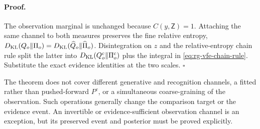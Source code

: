 \paragraph{Proof.}
The observation marginal is unchanged because $C(y,\mathsf Z)=1$.  Attaching
the same channel to both measures preserves the fine relative entropy,
$D_{\mathrm{KL}}(Q_o\Vert\Pi_o)=D_{\mathrm{KL}}(\widehat Q_o\Vert\widehat\Pi_o)$.  Disintegration on
$z$ and the relative-entropy chain rule split the latter into
$D_{\mathrm{KL}}(Q_o^c\Vert\Pi_o^c)$ plus the integral in
\eqref{eq:rg-vfe-chain-rule}.  Substitute the exact evidence identities at the
two scales.  $\square$

The theorem does not cover different generative and recognition channels, a
fitted rather than pushed-forward $P^c$, or a simultaneous coarse-graining of
the observation.  Such operations generally change the comparison target or
the evidence event.  An invertible or evidence-sufficient observation channel
is an exception, but its preserved event and posterior must be proved
explicitly.  

